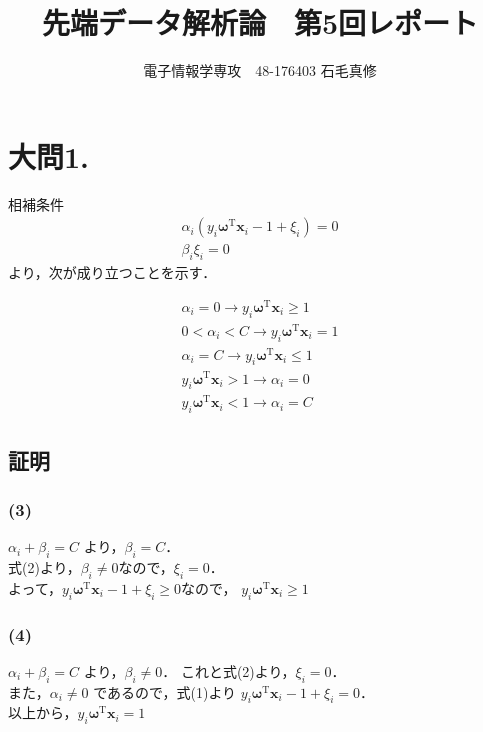 \documentclass[fleqn]{jsarticle}
\begin{document}
\newcommand{\argmax}{\mathop{\rm argmax}\limits}
\newcommand{\argmin}{\mathop{\rm argmin}\limits}

\title{先端データ解析論　第5回レポート}
\author{電子情報学専攻　48-176403 石毛真修}
\maketitle



\section*{大問1.}
相補条件
\begin{eqnarray}
  \alpha_i (y_i {\mathbf \omega^{\mathrm T} {\mathbf x}_i - 1 + \xi_i}) = 0\\
  \beta_i \xi_i = 0
\end{eqnarray}
より，次が成り立つことを示す．

\begin{eqnarray}
  \alpha_i = 0 \to y_i {\mathbf \omega}^{\mathrm T} {\mathbf x}_i \geq 1\\
  0 < \alpha_i < C \to y_i {\mathbf \omega}^{\mathrm T} {\mathbf x}_i = 1\\
  \alpha_i = C \to y_i {\mathbf \omega}^{\mathrm T} {\mathbf x}_i \leq 1\\
  y_i {\mathbf \omega}^{\mathrm T} {\mathbf x}_i > 1 \to \alpha_i = 0\\
  y_i {\mathbf \omega}^{\mathrm T} {\mathbf x}_i < 1 \to \alpha_i = C
\end{eqnarray}


\subsection*{証明}
\subsubsection*{(3)}
$\alpha_i + \beta_i = C$ より，$\beta_i = C$．\\
式(2)より，$\beta_i \neq 0$なので，$\xi_i = 0$．\\
よって，$y_i {\mathbf \omega}^{\mathrm T} {\mathbf x}_i - 1 + \xi_i \geq 0$なので，
$y_i {\mathbf \omega}^{\mathrm T} {\mathbf x}_i \geq 1$

\subsubsection*{(4)}
$\alpha_i + \beta_i = C$ より，$\beta_i \neq 0$．
これと式(2)より，$\xi_i = 0$．\\
また，$\alpha_i \neq 0$ であるので，式(1)より
$y_i {\mathbf \omega}^{\mathrm T} {\mathbf x}_i - 1 + \xi_i = 0$．\\
以上から，$y_i {\mathbf \omega}^{\mathrm T} {\mathbf x}_i = 1$
\end{document}
